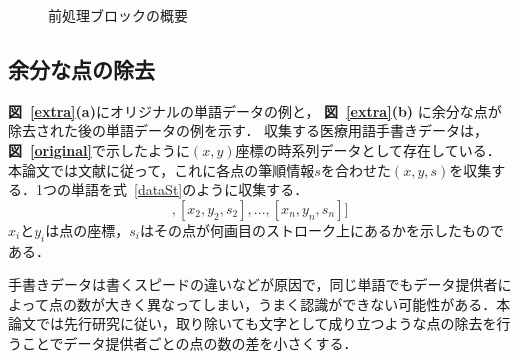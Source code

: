 \begin{figure}[tb]
 \begin{center}
  \caption{前処理ブロックの概要}
  \label{preprocess}
\end{center}
\end{figure}

\subsection{余分な点の除去}
\label{remove_points}
\textbf{図~\ref{extra}(a)}にオリジナルの単語データの例と， \textbf{図~\ref{extra}(b)} に余分な点が除去された後の単語データの例を示す．
収集する医療用語手書きデータは，\textbf{図~\ref{original}}で示したように$(x, y)$座標の時系列データとして存在している．本論文では文献\cite{zhang18:drawing}に従って，これに各点の筆順情報$s$を合わせた$(x, y, s)$を収集する．1つの単語を式~\ref{dataSt}のように収集する．
\begin{equation}
 [[x_1, y_1, s_1], [x_2, y_2, s_2],..., [x_n, y_n, s_n]]
 \label{dataSt}
\end{equation}
$x_i$と$y_i$は点の座標，$s_i$はその点が何画目のストローク上にあるかを示したものである．

手書きデータは書くスピードの違いなどが原因で，同じ単語でもデータ提供者によって点の数が大きく異なってしまい，うまく認識ができない可能性がある．本論文では先行研究に従い，取り除いても文字として成り立つような点の除去を行うことでデータ提供者ごとの点の数の差を小さくする．

